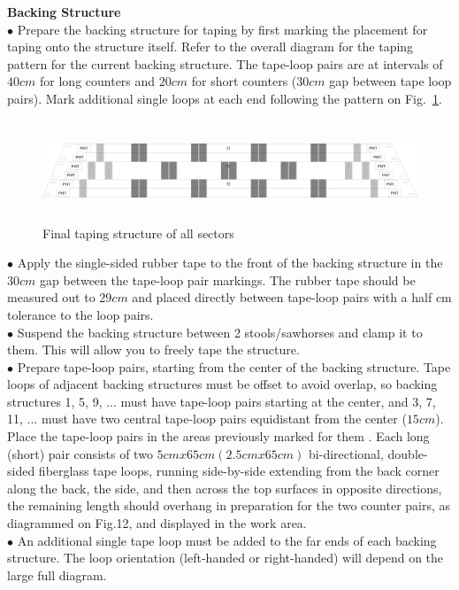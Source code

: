 \textbf{\color[rgb]{1,0.5,0} Backing Structure} \\
$\bullet$ Prepare the backing structure for taping by first marking the placement for taping onto the structure itself. Refer to the overall diagram for the taping pattern for the current backing structure. The tape-loop pairs are at intervals of $40 cm$ for long counters and $20 cm$ for short counters ($30 cm$ gap between tape loop pairs). Mark additional single loops at each end following the pattern on Fig.~\ref{sector3135}.\\
\begin{figure}[h!]
\centerline{\includegraphics[width=13cm,height=3cm]{ye/fig_ye_pmt_test/sector-31-35.pdf}}
\caption{Final taping structure of all sectors }
\label{sector3135}
\end{figure}
$\bullet$ Apply the single-sided rubber tape to the front of the backing structure in the $30 cm$ gap between the tape-loop pair markings. The rubber tape should be measured out to $29 cm$ and placed directly between tape-loop pairs with a half cm tolerance to the loop pairs.\\
$\bullet$ Suspend the backing structure between 2 stools/sawhorses and clamp it to them. This will allow you to freely tape the structure.\\
$\bullet$ Prepare tape-loop pairs, starting from the center of the backing structure. Tape loops of adjacent backing structures must be offset to avoid overlap, so backing structures 1, 5, 9, ... must have tape-loop pairs starting at the center, and 3, 7, 11, ... must have two central tape-loop pairs equidistant from the center ($15 cm$). Place the tape-loop pairs in the areas previously marked for them . Each long (short) pair consists of two $5 cm x 65 cm (2.5 cm x 65 cm)$ bi-directional, double-sided fiberglass tape loops, running side-by-side extending from the back corner along the back, the side, and then across the top surfaces in opposite directions, the remaining length should overhang in preparation for the two counter pairs, as diagrammed on Fig.12, and displayed in the work area.\\
$\bullet$ An additional single tape loop must be added to the far ends of each backing structure. The loop orientation (left-handed or right-handed) will depend on the large full diagram.\\
